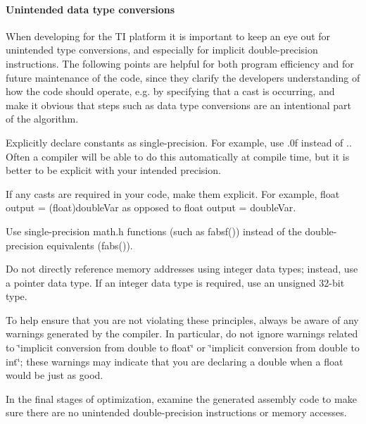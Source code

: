\hypertarget{a00362_subsubsection__unintended_data_type_conversions_}{}\paragraph{Unintended data type conversions}\label{a00362_subsubsection__unintended_data_type_conversions_}
 When developing for the T\+I platform it is important to keep an eye out for unintended type conversions, and especially for implicit double-\/precision instructions. The following points are helpful for both program efficiency and for future maintenance of the code, since they clarify the developer\textquotesingle{}s understanding of how the code should operate, e.\+g. by specifying that a cast is occurring, and make it obvious that steps such as data type conversions are an intentional part of the algorithm. 
\begin{DoxyItemize}
\item Explicitly declare constants as single-\/precision. For example, use {.\+0f} instead of {.}. Often a compiler will be able to do this automatically at compile time, but it is better to be explicit with your intended precision.  
\item If any casts are required in your code, make them explicit. For example, {\ttfamily float output = (float)double\+Var} as opposed to {\ttfamily float output = double\+Var}.  
\item Use single-\/precision math.\+h functions (such as {\ttfamily fabsf()}) instead of the double-\/precision equivalents ({\ttfamily fabs()}).  
\item Do not directly reference memory addresses using integer data types; instead, use a pointer data type. If an integer data type is required, use an unsigned 32-\/bit type.  
\end{DoxyItemize}

To help ensure that you are not violating these principles, always be aware of any warnings generated by the compiler. In particular, do not ignore warnings related to \char`\"{}implicit conversion from \textquotesingle{}double\textquotesingle{} to \textquotesingle{}float\textquotesingle{}\char`\"{} or \char`\"{}implicit conversion from \textquotesingle{}double\textquotesingle{} to \textquotesingle{}int\textquotesingle{}\char`\"{}; these warnings may indicate that you are declaring a double when a float would be just as good.

In the final stages of optimization, examine the generated assembly code to make sure there are no unintended double-\/precision instructions or memory accesses.


